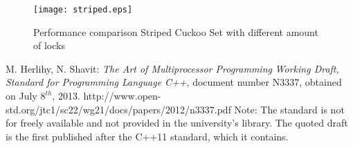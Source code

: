 \documentclass[a4paper,10pt]{article}
\begin{document}
\begin{figure}[H]
\begin{center}
\texttt{[image: striped.eps]}
\end{center}
\caption{Performance comparison Striped Cuckoo Set with different amount of locks}
\label{fig:plot3}
\end{figure}

\pagebreak

\begin{thebibliography}{9}
    M. Herlihy, N. Shavit:
   \emph{The Art of Multiprocessor Programming}
	\emph{Working Draft, Standard for Programming Language C++},
	document number N3337, obtained on July $8^{th}$, 2013.	
	http://www.open-std.org/jtc1/sc22/wg21/docs/papers/2012/n3337.pdf
	\newline
	Note: The standard is not for freely available and not provided in the university's  library. The quoted draft is the first published after the C++11 standard, which it contains.

\end{thebibliography}
\end{document}
